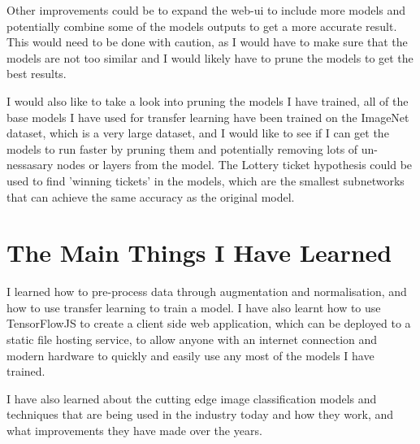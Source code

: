 \documentclass[]{final_report}
\begin{document}
Other improvements could be to expand the web-ui to include more models and potentially combine some of the models outputs to get a more accurate result. This would need to be done with caution, as I would have to make sure that the models are not too similar and I would likely have to prune the models to get the best results.

I would also like to take a look into pruning the models I have trained, all of the base models I have used for transfer learning have been trained on the ImageNet dataset, which is a very large dataset, and I would like to see if I can get the models to run faster by pruning them and potentially removing lots of un-nessasary nodes or layers from the model. The Lottery ticket hypothesis\cite{LotteryTicket} could be used to find 'winning tickets' in the models, which are the smallest subnetworks that can achieve the same accuracy as the original model.

\section{The Main Things I Have Learned}

I learned how to pre-process data through augmentation and normalisation, and how to use transfer learning to train a model. I have also learnt how to use TensorFlowJS to create a client side web application, which can be deployed to a static file hosting service, to allow anyone with an internet connection and modern hardware to quickly and easily use any most of the models I have trained.

I have also learned about the cutting edge image classification models and techniques that are being used in the industry today and how they work, and what improvements they have made over the years.

\newpage
\printbibliography
\label{endpage}
\end{document}
